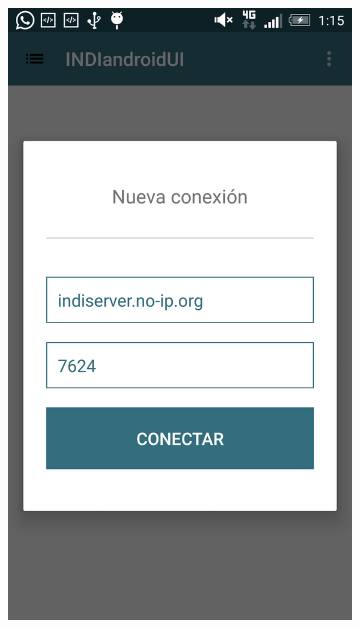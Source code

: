 \begin{figure}
    \centering
    \begin{subfigure}[]{0.4\textwidth}
        \includegraphics[width=\textwidth]{../images/captura.png}
        \caption{}
        \label{fig:captura1}
    \end{subfigure}
    \begin{subfigure}[]{0.4\textwidth}

\end{subfigure}
\end{figure}
